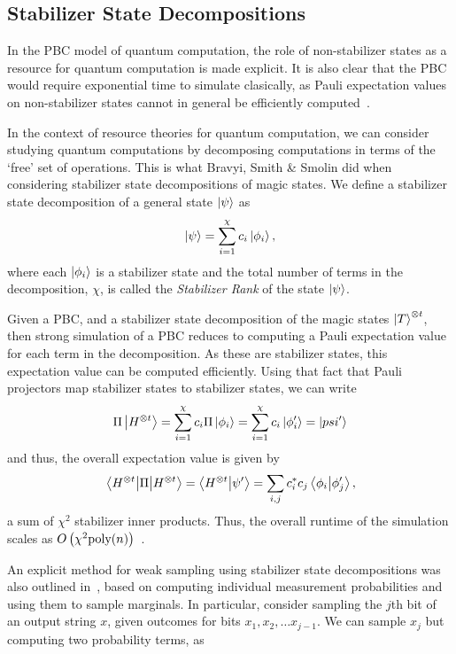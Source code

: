 \subsection{Stabilizer State Decompositions}\label{sec:pbc_decomposition}
In the PBC model of quantum computation, the role of non-stabilizer states as a resource for quantum computation is made explicit. It is also clear that the PBC would require exponential time to simulate clasically, as Pauli expectation values on non-stabilizer states cannot in general be efficiently computed~\cite{Gottesman1998b}.\par
In the context of resource theories for quantum computation, we can consider studying quantum computations by decomposing computations in terms of the `free' set of operations. This is what Bravyi, Smith \& Smolin did when considering stabilizer state decompositions of magic states. We define a stabilizer state decomposition of a general state $\ket{\psi}$ as
\begin{equation}
\ket{\psi} = \sum_{i=1}^{\chi}c_{i}\ket{\phi_{i}},
\label{eq:stab_state_decomposition}
\end{equation}
where each $\ket{\phi_{i}}$ is a stabilizer state and the total number of terms in the decomposition, $\chi$, is called the \emph{Stabilizer Rank} of the state $\ket{\psi}$.\par
Given a PBC, and a stabilizer state decomposition of the magic states $\ket{T}^{\otimes t}$, then strong simulation of a PBC reduces to computing a Pauli expectation value for each term in the decomposition. As these are stabilizer states, this expectation value can be computed efficiently. Using that fact that Pauli projectors map stabilizer states to stabilizer states, we can write
\[\Pi\ket{H^{\otimes t}} = \sum_{i=1}^{\chi}c_{i}\Pi\ket{\phi_{i}}=\sum_{i=1}^{\chi}c_{i}\ket{\phi_{i}'}=\ket{psi'}\]
and thus, the overall expectation value is given by
\begin{equation}
\matrixel{H^{\otimes t}}{\Pi}{H^{\otimes t}} = \braket{H^{\otimes t}}{\psi'} = \sum_{i,j}c_{i}^{*}c_{j}\braket{\phi_{i}}{\phi'_{j}},
\end{equation}
a sum of $\chi^{2}$ stabilizer inner products. Thus, the overall runtime of the simulation scales as $O\left(\chi^{2}\text{poly}(n)\right)$~\cite{Bravyi2015}.\par
An explicit method for weak sampling using stabilizer state decompositions was also outlined in~\cite{Bravyi2015}, based on computing individual measurement probabilities and using them to sample marginals. In particular, consider sampling the $j$th bit of an output string $x$, given outcomes for bits $x_{1},x_{2},\dots x_{j-1}$. We can sample $x_{j}$ but computing two probability terms, as~\cite{Bravyi2016}
